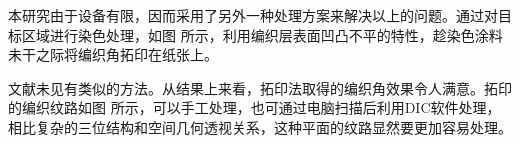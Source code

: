 \begin{figure}[!htbp]
	\centering
	\hspace{1cm}
	\label{fig:dic}
\end{figure}

本研究由于设备有限，因而采用了另外一种处理方案来解决以上的问题。通过对目标区域进行染色处理，如图 所示，利用编织层表面凹凸不平的特性，趁染色涂料未干之际将编织角拓印在纸张上。

文献未见有类似的方法。从结果上来看，拓印法取得的编织角效果令人满意。拓印的编织纹路如图 所示，可以手工处理，也可通过电脑扫描后利用DIC软件处理，相比复杂的三位结构和空间几何透视关系，这种平面的纹路显然要更加容易处理。

\begin{figure}[!htbp]
	\centering
	\hspace{1cm}
\end{figure}

